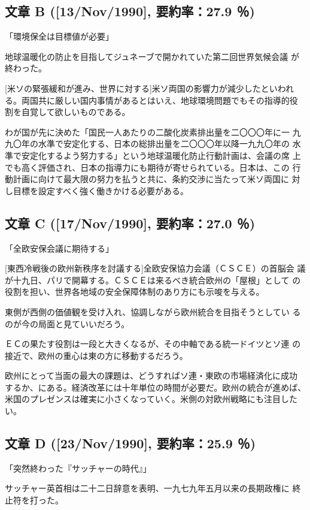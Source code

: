 \subsection*{文章 B {\rm ([13/Nov/1990], 要約率：27.9 ％)}}
\centerline{\large 「環境保全は目標値が必要」}

地球温暖化の防止を目指してジュネーブで開かれていた第二回世界気候会議
が終わった。

[米ソの緊張緩和が進み、世界に対する]米ソ両国の影響力が減少したといわれ
る。両国共に厳しい国内事情があるとはいえ、地球環境問題でもその指導的役
割を自覚して欲しいものである。

わが国が先に決めた「国民一人あたりの二酸化炭素排出量を二〇〇〇年に一
九九〇年の水準で安定化する、日本の総排出量を二〇〇〇年以降一九九〇年の
水準で安定化するよう努力する」という地球温暖化防止行動計画は、会議の席
上でも高く評価され、日本の指導力にも期待が寄せられている。日本は、この
行動計画に向けて最大限の努力を払うと共に、条約交渉に当たって米ソ両国に
対し目標を設定すべく強く働きかける必要がある。


\subsection*{文章 C {\rm ([17/Nov/1990], 要約率：27.0 ％)}}
\centerline{\large 「全欧安保会議に期待する」}

[東西冷戦後の欧州新秩序を討議する]全欧安保協力会議（ＣＳＣＥ）の首脳会
議が十九日、パリで開幕する。ＣＳＣＥは来るべき統合欧州の「屋根」として
の役割を担い、世界各地域の安全保障体制のあり方にも示唆を与える。

東側が西側の価値観を受け入れ、協調しながら欧州統合を目指そうとしてい
るのが今の局面と見ていいだろう。

ＥＣの果たす役割は一段と大きくなるが、その中軸である統一ドイツとソ連
の接近で、欧州の重心は東の方に移動するだろう。

欧州にとって当面の最大の課題は、どうすればソ連・東欧の市場経済化に成功
するか、にある。経済改革には十年単位の時間が必要だ。欧州の統合が進めば、
米国のプレゼンスは確実に小さくなっていく。米側の対欧州戦略にも注目した
い。


\subsection*{文章 D {\rm ([23/Nov/1990], 要約率：25.9 ％)}}
\centerline{\large 「突然終わった『サッチャーの時代』」}

サッチャー英首相は二十二日辞意を表明、一九七九年五月以来の長期政権に
終止符を打った。

